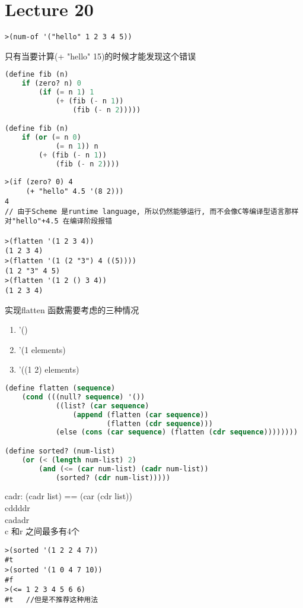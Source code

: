 \documentclass{article}
\begin{document}
\section{Lecture 20}
\begin{verbatim}
>(num-of '("hello" 1 2 3 4 5))
\end{verbatim}
只有当要计算(+ "hello" 15)的时候才能发现这个错误

\begin{lstlisting}[language = Lisp]
(define fib (n)
	if (zero? n) 0
		(if (= n 1) 1
			(+ (fib (- n 1))
				(fib (- n 2)))))

(define fib (n)
	if (or (= n 0)
			(= n 1)) n
		(+ (fib (- n 1))
			(fib (- n 2))))
\end{lstlisting}

\begin{verbatim}
>(if (zero? 0) 4
	 (+ "hello" 4.5 '(8 2)))
4
// 由于Scheme 是runtime language, 所以仍然能够运行, 而不会像C等编译型语言那样对"hello"+4.5 在编译阶段报错

>(flatten '(1 2 3 4))
(1 2 3 4)
>(flatten '(1 (2 "3") 4 ((5))))
(1 2 "3" 4 5)
>(flatten '(1 2 () 3 4))
(1 2 3 4)
\end{verbatim}

实现flatten 函数需要考虑的三种情况
\begin{enumerate}
	\item '()
	\item '(1 elements)
	\item '((1 2) elements)
\end{enumerate}

\begin{lstlisting}[language = Lisp]
(define flatten (sequence)
	(cond (((null? sequence) '())
			((list? (car sequence)
				(append (flatten (car sequence))
						(flatten (cdr sequence)))
			(else (cons (car sequence) (flatten (cdr sequence))))))))

(define sorted? (num-list)
	(or (< (length num-list) 2)
		(and (<= (car num-list) (cadr num-list))
			(sorted? (cdr num-list)))))
\end{lstlisting}

\bigskip\noindent
cadr: (cadr list) == (car (cdr list))\\
cddddr\\
cadadr\\
c 和r 之间最多有4个

\begin{verbatim}
>(sorted '(1 2 2 4 7))
#t
>(sorted '(1 0 4 7 10))
#f
>(<= 1 2 3 4 5 6 6)
#t   //但是不推荐这种用法
\end{verbatim}
\end{document}
